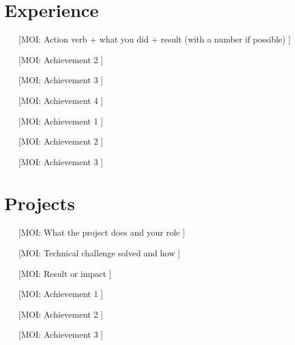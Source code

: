 \section{Experience}

\begin{itemize}
  \item [[MOI: Action verb + what you did + result (with a number if possible)]]
  \item [[MOI: Achievement 2]]
  \item [[MOI: Achievement 3]]
  \item [[MOI: Achievement 4]]
\end{itemize}
\entre

\begin{itemize}
  \item [[MOI: Achievement 1]]
  \item [[MOI: Achievement 2]]
  \item [[MOI: Achievement 3]]
\end{itemize}

\section{Projects}

\begin{itemize}
  \item [[MOI: What the project does and your role]]
  \item [[MOI: Technical challenge solved and how]]
  \item [[MOI: Result or impact]]
\end{itemize}
\entre

\begin{itemize}
  \item [[MOI: Achievement 1]]
  \item [[MOI: Achievement 2]]
  \item [[MOI: Achievement 3]]
\end{itemize}
\entre

